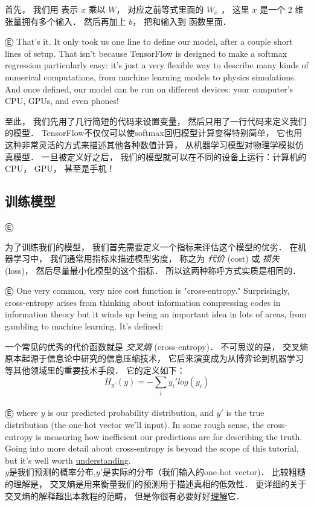 首先， 我们用  表示 $x$ 乘以 $W$， 对应之前等式里面的 $W_x$ ， 这里 $x$ 是一个 2 维张量拥有多个输入．  然后再加上 $b$， 把和输入到 函数里面．

Ⓔ That's it. It only took us one line to define our model, after a couple short lines of setup. That isn't because TensorFlow is designed to make a softmax regression particularly easy: it's just a very flexible way to describe many kinds of numerical computations, from machine learning models to physics simulations. And once defined, our model can be run on different devices: your computer's CPU, GPUs, and even phones!

至此， 我们先用了几行简短的代码来设置变量， 然后只用了一行代码来定义我们的模型．  TensorFlow不仅仅可以使softmax回归模型计算变得特别简单， 它也用这种非常灵活的方式来描述其他各种数值计算， 从机器学习模型对物理学模拟仿真模型．  一旦被定义好之后， 我们的模型就可以在不同的设备上运行：计算机的CPU， GPU， 甚至是手机！

\subsection{训练模型}

Ⓔ 

为了训练我们的模型， 我们首先需要定义一个指标来评估这个模型的优劣．  在机器学习中， 我们通常用指标来描述模型劣度， 称之为 {\em 代价} (cost) 或 {\em 损失} (loss)， 然后尽量最小化模型的这个指标．  所以这两种称呼方式实质是相同的．

Ⓔ One very common, very nice cost function is "cross-entropy." Surprisingly, cross-entropy arises from thinking about information compressing codes in information theory but it winds up being an important idea in lots of areas, from gambling to machine learning. It's defined:

一个常见的优秀的代价函数就是 {\em 交叉熵} (cross-entropy)．  不可思议的是， 交叉熵原本起源于信息论中研究的信息压缩技术， 它后来演变成为从博弈论到机器学习等其他领域里的重要技术手段．  它的定义如下：
\\
\begin{equation}
H_{y'}(y) = -\sum_i{y_{i}'log(y_i)}
\end{equation}
\\
Ⓔ where $y$ is our predicted probability distribution, and $y'$ is the true distribution (the one-hot vector we'll input). In some rough sense, the cross-entropy is measuring how inefficient our predictions are for describing the truth. Going into more detail about cross-entropy is beyond the scope of this tutorial, but it's well worth \href{http://colah.github.io/posts/2015-09-Visual-Information/}{understanding}.
\\
$y$是我们预测的概率分布,$y'$是实际的分布（我们输入的one-hot vector)．  比较粗糙的理解是， 交叉熵是用来衡量我们的预测用于描述真相的低效性．  更详细的关于交叉熵的解释超出本教程的范畴， 但是你很有必要好好\href{http://colah.github.io/posts/2015-09-Visual-Information/}{理解}它．

